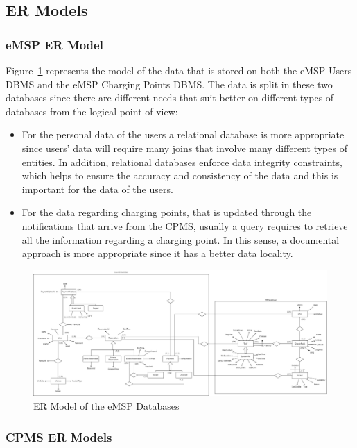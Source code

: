 \documentclass{Configuration_Files/PoliMi3i_thesis}
\begin{document}
\subsection{ER Models}

\subsubsection{eMSP ER Model}

Figure~\ref{fig:emsp-er} represents the model of the data that is stored on both the eMSP Users DBMS and the eMSP Charging Points DBMS. The data is split in these two databases since there are different needs that suit better on different types of databases from the logical point of view:
\begin{itemize}
    \item For the personal data of the users a relational database is more appropriate since users' data will require many joins that involve many different types of entities. In addition, relational databases enforce data integrity constraints, which helps to ensure the accuracy and consistency of the data and this is important for the data of the users.
    \item For the data regarding charging points, that is updated through the notifications that arrive from the CPMS, usually a query requires to retrieve all the information regarding a charging point. In this sense, a documental approach is more appropriate since it has a better data locality.
\end{itemize}

\begin{figure}[H]
    \centering
    \includegraphics[width=1\textwidth]{Images/er-models/emsp_data_model.jpg}
    \caption{ER Model of the eMSP Databases}
    \label{fig:emsp-er}
\end{figure}

\subsubsection{CPMS ER Models}
\end{document}
